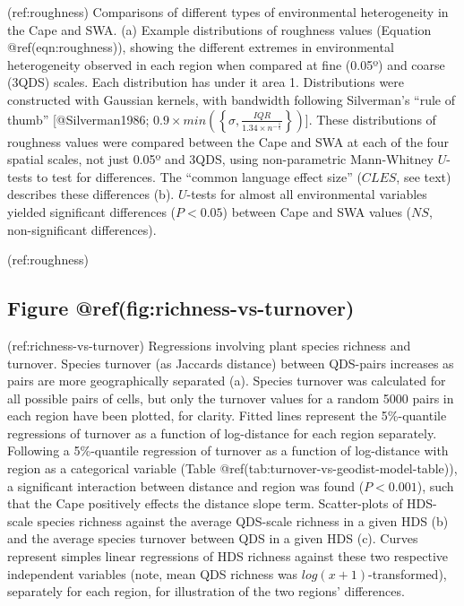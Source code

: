 (ref:roughness) Comparisons of different types of environmental
heterogeneity in the Cape and SWA. (a) Example distributions of
roughness values (Equation @ref(eqn:roughness)), showing the different
extremes in environmental heterogeneity observed in each region when
compared at fine (0.05º) and coarse (3QDS) scales. Each distribution has
under it area 1. Distributions were constructed with Gaussian kernels,
with bandwidth following Silverman's ``rule of thumb''
{[}@Silverman1986;
\(0.9 \times min \left ( \left \{ \sigma, \frac{IQR}{1.34 \times n^{-\frac{1}{5}}} \right \} \right )\){]}.
These distributions of roughness values were compared between the Cape
and SWA at each of the four spatial scales, not just 0.05º and 3QDS,
using non-parametric Mann-Whitney \(U\)-tests to test for differences.
The ``common language effect size'' (\(CLES\), see text) describes these
differences (b). \(U\)-tests for almost all environmental variables
yielded significant differences (\(P < 0.05\)) between Cape and SWA
values (\(NS\), non-significant differences).

(ref:roughness)

\hypertarget{figure-reffigrichness-vs-turnover}{%
\subsection*{Figure
@ref(fig:richness-vs-turnover)}\label{figure-reffigrichness-vs-turnover}}

(ref:richness-vs-turnover) Regressions involving plant species richness
and turnover. Species turnover (as Jaccards distance) between QDS-pairs
increases as pairs are more geographically separated (a). Species
turnover was calculated for all possible pairs of cells, but only the
turnover values for a random 5000 pairs in each region have been
plotted, for clarity. Fitted lines represent the 5\%-quantile
regressions of turnover as a function of log-distance for each region
separately. Following a 5\%-quantile regression of turnover as a
function of log-distance with region as a categorical variable (Table
@ref(tab:turnover-vs-geodist-model-table)), a significant interaction
between distance and region was found (\(P < 0.001\)), such that the
Cape positively effects the distance slope term. Scatter-plots of
HDS-scale species richness against the average QDS-scale richness in a
given HDS (b) and the average species turnover between QDS in a given
HDS (c). Curves represent simples linear regressions of HDS richness
against these two respective independent variables (note, mean QDS
richness was \(log(x + 1)\)-transformed), separately for each region,
for illustration of the two regions' differences.

